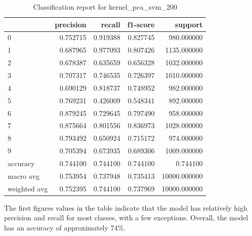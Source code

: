 \begin{table}[htb!]
    \centering
    \caption{Classification report for kernel_pca_svm_200}
    \label{tab:classification-report-kernel_pca_svm_200}
    \begin{tabular}{lrrrr}
    \toprule
     & precision & recall & f1-score & support \\
    \midrule
    0 & 0.752715 & 0.919388 & 0.827745 & 980.000000 \\
    1 & 0.687965 & 0.977093 & 0.807426 & 1135.000000 \\
    2 & 0.678387 & 0.635659 & 0.656328 & 1032.000000 \\
    3 & 0.707317 & 0.746535 & 0.726397 & 1010.000000 \\
    4 & 0.690129 & 0.818737 & 0.748952 & 982.000000 \\
    5 & 0.769231 & 0.426009 & 0.548341 & 892.000000 \\
    6 & 0.879245 & 0.729645 & 0.797490 & 958.000000 \\
    7 & 0.875664 & 0.801556 & 0.836973 & 1028.000000 \\
    8 & 0.793492 & 0.650924 & 0.715172 & 974.000000 \\
    9 & 0.705394 & 0.673935 & 0.689306 & 1009.000000 \\
    accuracy & 0.744100 & 0.744100 & 0.744100 & 0.744100 \\
    macro avg & 0.753954 & 0.737948 & 0.735413 & 10000.000000 \\
    weighted avg & 0.752395 & 0.744100 & 0.737969 & 10000.000000 \\
    \bottomrule
    \end{tabular}
    \end{table}


The first figures values in the table indicate that the model has relatively high precision and recall for most classes, with a few exceptions. Overall, the model has an accuracy of approximately 74\%.

